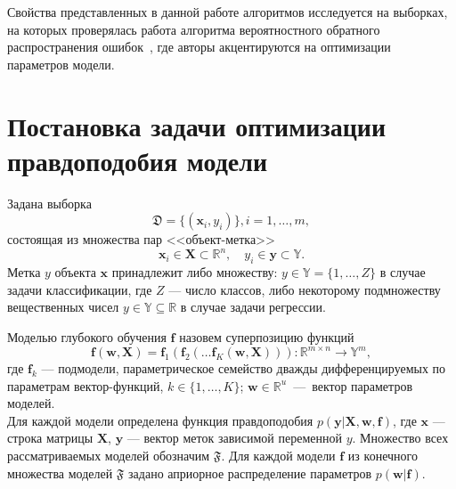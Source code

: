 \documentclass[12pt]{a&t}
\begin{document}
Свойства представленных в данной работе  алгоритмов исследуется на выборках, на которых проверялась работа алгоритма вероятностного обратного распространения ошибок~\cite{pbp}, где авторы акцентируются на оптимизации параметров модели. 


\section{Постановка задачи оптимизации правдоподобия модели}
Задана выборка  \begin{equation}\label{eq:dataset}\mathfrak{D} = \{(\mathbf{x}_i,y_i)\}, i = 1,\dots,m,\end{equation} состоящая из множества пар <<объект-метка>> $$\mathbf{x}_i \in \mathbf{X} \subset \mathbb{R}^n, \quad {y}_i \in \mathbf{y} \subset \mathbb{Y}.$$ Метка ${y}$  объекта $\mathbf{x}$ принадлежит либо множеству: ${y} \in \mathbb{Y} = \{1, \dots, Z\}$ в случае задачи классификации, где $Z$ --- число классов, либо некоторому подмножеству вещественных чисел ${y} \in \mathbb{Y}  \subseteq \mathbb{R}$ в случае задачи регрессии.

Моделью глубокого обучения $\mathbf{f}$ назовем суперпозицию функций
\begin{equation}
\label{eq:main}
 \mathbf{f}(\mathbf{w}, \mathbf{X}) = \mathbf{f}_1(\mathbf{f}_2(\dots \mathbf{f}_K(\mathbf{w}, \mathbf{X}))): \mathbb{R}^{m \times n} \to \mathbb{Y}^m,
\end{equation}
где $\mathbf{f}_k$ --- подмодели, параметрическое семейство дважды дифференцируемых по параметрам вектор-функций, $k \in \{1,\dots,K\}$; $\mathbf{w} \in \mathbb{R}^u$~---~вектор параметров моделей.\\
Для каждой модели определена функция правдоподобия  $p(\mathbf{y}|\mathbf{X}, \mathbf{w}, \mathbf{f})$, где $\mathbf{x}$ --- строка матрицы $\mathbf{X}$, $\mathbf{y}$ --- вектор меток зависимой переменной $y$.
Множество всех рассматриваемых моделей обозначим $\mathfrak{F}$. Для каждой модели $\mathbf{f}$ из конечного множества моделей $\mathfrak{F}$ задано априорное распределение параметров $p(\mathbf{w}|\mathbf{f})$.
\end{document}
